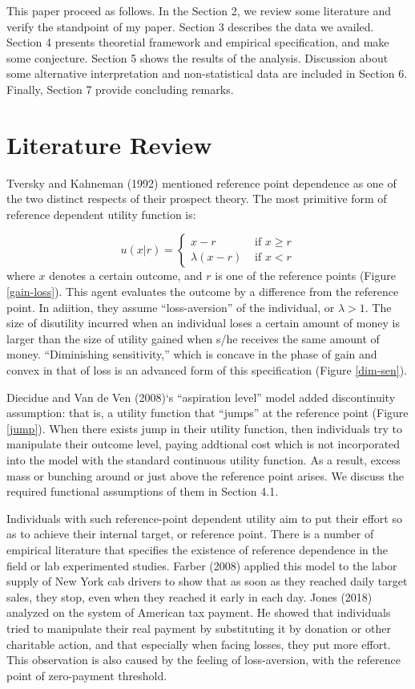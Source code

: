 \documentclass[dvipdfmx, 12pt]{article}
\begin{document}
This paper proceed as follows. In the Section 2, we review some literature and verify the standpoint of my paper. Section 3 describes the data we availed. Section 4 presents theoretial framework and empirical  specification, and make some conjecture.  Section 5 shows the results of the analysis. Discussion about some alternative interpretation and non-statistical data are included in Section 6. Finally, Section 7 provide concluding remarks.

\section{Literature Review}

  Tversky and Kahneman (1992) mentioned reference point dependence as one of the two distinct respects of their prospect theory. The most primitive form of reference dependent utility function is:

   \[
  u(x | r) = \begin{cases}
  x - r & \text{ if }x \geq r \\
  \lambda (x - r) & \text{ if }x < r
\end{cases}
  \]
  where $x$ denotes a certain outcome, and $r$ is one of the reference points (Figure \ref{gain-loss}). This agent evaluates the outcome by a difference from the reference point. In adiition, they assume ``loss-aversion'' of the individual, or $\lambda > 1$. The size of disutility incurred when an individual loses a certain amount of money is larger than the size of utility gained when s/he receives the same amount of money. ``Diminishing sensitivity,'' which is concave in the phase of gain and convex in that of loss is an advanced form of this specification (Figure \ref{dim-sen}).

  Diecidue and Van de Ven (2008)`s ``aspiration level'' model added discontinuity assumption: that is, a utility function that ``jumps'' at the reference point (Figure \ref{jump}). When there exists jump in their utility function, then individuals try to manipulate their outcome level, paying addtional cost which is not incorporated into the model with the standard continuous utility function. As a result,  excess mass or bunching around or just above the reference point arises. We discuss the required functional assumptions of them in Section 4.1.

  Individuals with such reference-point dependent utility aim to put their effort so as to achieve their internal target, or reference point. There is a number of empirical literature that specifies the existence of reference dependence in the field or lab experimented studies. Farber (2008) applied this model to the labor supply of New York cab drivers to show that as soon as they reached daily target sales, they stop, even when they reached it early in each day. Jones (2018) analyzed on the system of American tax payment. He showed that individuals tried to manipulate their real payment by substituting it by donation or other charitable action, and that especially when facing losses, they put more effort. This observation is also caused by the feeling of loss-aversion, with the reference point of zero-payment threshold.
\end{document}
